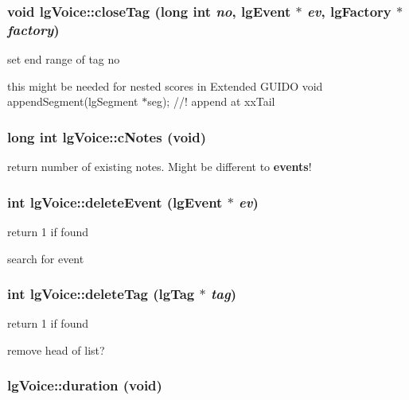 \subsubsection{\setlength{\rightskip}{0pt plus 5cm}void lg\-Voice::close\-Tag (long int {\em no}, {\bf lg\-Event} $\ast$ {\em ev}, {\bf lg\-Factory} $\ast$ {\em factory})}\label{classlgVoice_a10}


set end range of tag no 

this might be needed for nested scores in Extended GUIDO void append\-Segment(lg\-Segment $\ast$seg); //! append at xx\-Tail 
\subsubsection{\setlength{\rightskip}{0pt plus 5cm}long int lg\-Voice::c\-Notes (void)\hspace{0.3cm}{\tt  [virtual]}}\label{classlgVoice_a16}


return number of existing notes. Might be different to {\bf events}! 

\subsubsection{\setlength{\rightskip}{0pt plus 5cm}int lg\-Voice::delete\-Event ({\bf lg\-Event} $\ast$ {\em ev})}\label{classlgVoice_a5}


return 1 if found 

search for event 
\subsubsection{\setlength{\rightskip}{0pt plus 5cm}int lg\-Voice::delete\-Tag ({\bf lg\-Tag} $\ast$ {\em tag})}\label{classlgVoice_a4}


return 1 if found 

remove head of list? 
\subsubsection{ lg\-Voice::duration (void)\hspace{0.3cm}{\tt  [virtual]}}\label{classlgVoice_a22}


